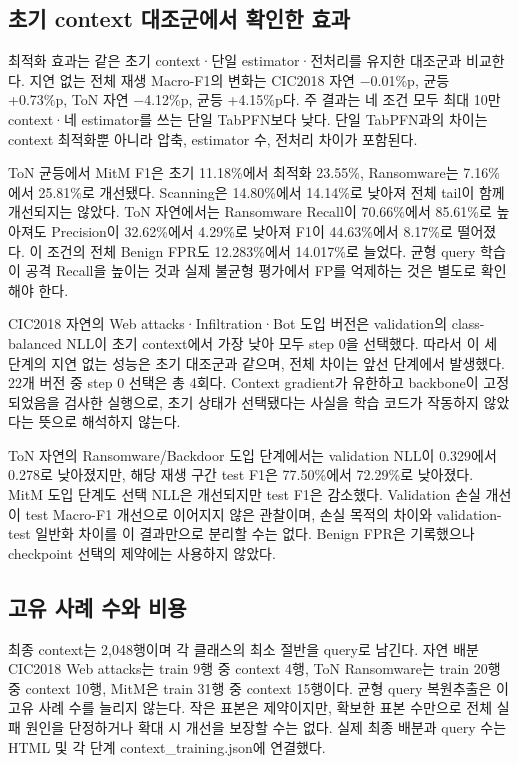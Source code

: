\subsection{초기 context 대조군에서 확인한 효과}
최적화 효과는 같은 초기 context·단일 estimator·전처리를 유지한 대조군과 비교한다. 지연 없는 전체 재생 Macro-F1의 변화는 CIC2018 자연 −0.01\%p, 균등 +\allowbreak{}0.73\%p, ToN 자연 −4.12\%p, 균등 +\allowbreak{}4.15\%p다. 주 결과는 네 조건 모두 최대 10만 context·네 estimator를 쓰는 단일 TabPFN보다 낮다. 단일 TabPFN과의 차이는 context 최적화뿐 아니라 압축, estimator 수, 전처리 차이가 포함된다.

ToN 균등에서 MitM F1은 초기 11.18\%에서 최적화 23.55\%, Ransomware는 7.16\%에서 25.81\%로 개선됐다. Scanning은 14.80\%에서 14.14\%로 낮아져 전체 tail이 함께 개선되지는 않았다. ToN 자연에서는 Ransomware Recall이 70.66\%에서 85.61\%로 높아져도 Precision이 32.62\%에서 4.29\%로 낮아져 F1이 44.63\%에서 8.17\%로 떨어졌다. 이 조건의 전체 Benign FPR도 12.283\%에서 14.017\%로 늘었다. 균형 query 학습이 공격 Recall을 높이는 것과 실제 불균형 평가에서 FP를 억제하는 것은 별도로 확인해야 한다.

CIC2018 자연의 Web attacks·Infiltration·Bot 도입 버전은 validation의 class-balanced NLL이 초기 context에서 가장 낮아 모두 step 0을 선택했다. 따라서 이 세 단계의 지연 없는 성능은 초기 대조군과 같으며, 전체 차이는 앞선 단계에서 발생했다. 22개 버전 중 step 0 선택은 총 4회다. Context gradient가 유한하고 backbone이 고정되었음을 검사한 실행으로, 초기 상태가 선택됐다는 사실을 학습 코드가 작동하지 않았다는 뜻으로 해석하지 않는다.

ToN 자연의 Ransomware/\allowbreak{}Backdoor 도입 단계에서는 validation NLL이 0.329에서 0.278로 낮아졌지만, 해당 재생 구간 test F1은 77.50\%에서 72.29\%로 낮아졌다. MitM 도입 단계도 선택 NLL은 개선되지만 test F1은 감소했다. Validation 손실 개선이 test Macro-F1 개선으로 이어지지 않은 관찰이며, 손실 목적의 차이와 validation-test 일반화 차이를 이 결과만으로 분리할 수는 없다. Benign FPR은 기록했으나 checkpoint 선택의 제약에는 사용하지 않았다.

\subsection{고유 사례 수와 비용}
최종 context는 2,048행이며 각 클래스의 최소 절반을 query로 남긴다. 자연 배분 CIC2018 Web attacks는 train 9행 중 context 4행, ToN Ransomware는 train 20행 중 context 10행, MitM은 train 31행 중 context 15행이다. 균형 query 복원추출은 이 고유 사례 수를 늘리지 않는다. 작은 표본은 제약이지만, 확보한 표본 수만으로 전체 실패 원인을 단정하거나 확대 시 개선을 보장할 수는 없다. 실제 최종 배분과 query 수는 HTML 및 각 단계 context\_\allowbreak{}training.json에 연결했다.

